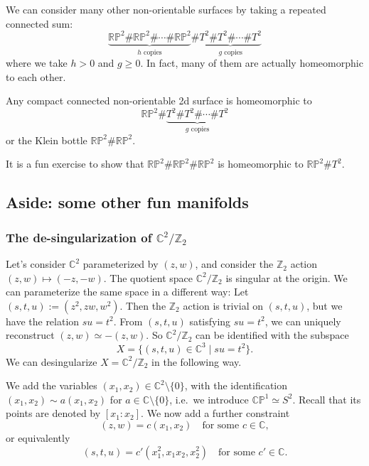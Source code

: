 \documentclass[12pt]{article}
\numberwithin{equation}{section}
\theoremstyle{remark}
\def\bC{\mathbb{C}}
\def\bZ{\mathbb{Z}}
\def\RP{\mathbb{RP}}
\def\CP{\mathbb{CP}}
\begin{document}
We can consider many other non-orientable surfaces by taking a repeated connected sum:
\begin{equation}
  \underbrace{\RP^2\#\RP^2\#\cdots\#\RP^2}_\text{$h$ copies}
  \#
  \underbrace{T^2\# T^2 \#\cdots\# T^2}_\text{$g$ copies}
\end{equation}
where we take $h>0$ and $g\ge 0$.
In fact, many of them are actually homeomorphic to each other.
\begin{fact}
Any compact connected non-orientable 2d surface is homeomorphic to
\begin{equation}
\RP^2 \# \underbrace{T^2\# T^2 \#\cdots\# T^2}_\text{$g$ copies}
\end{equation}
or the Klein bottle $\RP^2\#\RP^2$.
\end{fact}
It is a fun exercise to show that $\RP^2 \# \RP^2 \# \RP^2$ is homeomorphic to $\RP^2 \# T^2$.

\subsection{Aside: some other fun manifolds}


\subsubsection{The de-singularization of $\bC^2/\bZ_2$}
Let's consider $\bC^2$ parameterized by $(z,w)$,
and consider the $\bZ_2$ action $(z,w)\mapsto (-z,-w)$.
The quotient space $\bC^2/\bZ_2$ is singular at the origin.
We can parameterize the same space in a different way:
Let $(s,t,u):=(z^2, z w, w^2)$.
Then the $\bZ_2$ action is trivial on $(s,t,u)$, but we have the relation $su=t^2$.
From $(s,t,u)$ satisfying $su=t^2$, we can uniquely reconstruct $(z,w)\simeq -(z,w)$.
So $\bC^2/\bZ_2$ can be identified with the subspace \begin{equation}
X=\{ (s,t,u)\in \bC^3 \mid su=t^2 \}.
\end{equation}
We can desingularize $X=\bC^2/\bZ_2$ in the following way.

We add the variables $(x_1,x_2)\in \bC^2\setminus \{0\}$, with the identification 
$(x_1,x_2)\sim a(x_1,x_2)$ for $a\in \bC\setminus \{0\}$,
i.e.~we introduce $\CP^1\simeq S^2$.
Recall that its points are denoted by $[x_1:x_2]$.
We now add a further constraint \begin{equation}
(z,w) = c(x_1,x_2) \quad \text{for some $c\in \bC$},
\end{equation} or equivalently \begin{equation}
  (s,t,u)= c'(x_1^2, x_1 x_2, x_2^2) \quad \text{for some $c'\in \bC$}. \label{eq:blowup}
\end{equation}
\end{document}
